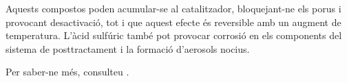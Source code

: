 Aquests compostos poden acumular-se al catalitzador, bloquejant-ne els porus i provocant desactivació, tot i que aquest efecte és reversible amb un augment de temperatura. L'àcid sulfúric també pot provocar corrosió en els components del sistema de posttractament i la formació d'aerosols nocius.


Per saber-ne més, consulteu \cite{selleri_overview_2021}.